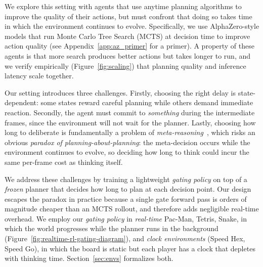 \documentclass{article}
\begin{document}
We explore this setting with agents that use anytime planning algorithms to improve the quality of their actions, but must confront that doing so takes time in which the environment continues to evolve. Specifically, we use AlphaZero-style models \citep{silver2018general} that run Monte Carlo Tree Search (MCTS) at decision time to improve action quality (see Appendix~\ref{app:az_primer} for a primer). A property of these agents is that more search produces better actions but takes longer to run, and we verify empirically (Figure~\ref{fig:scaling}) that planning quality and inference latency scale together.

Our setting introduces three challenges.
Firstly, choosing the right delay is state-dependent: some states reward careful planning
while others demand immediate reaction.
Secondly, the agent must commit to \emph{something} during the intermediate
frames, since the environment will not wait for the planner.
Lastly, choosing how long to deliberate is fundamentally a problem of
\emph{meta-reasoning}~\citep{russell1991right,horvitz2013reasoning},
which risks an obvious \emph{paradox of planning-about-planning}: the
meta-decision occurs while the environment continues to evolve, so
deciding how long to think could incur the same per-frame cost as thinking
itself.

We address these challenges by training a lightweight \emph{gating policy} on top of a \emph{frozen}
planner that decides how long to plan at
each decision point. Our design escapes the paradox in practice because a single gate
forward pass is orders of magnitude cheaper than an MCTS rollout, and
therefore adds negligible real-time overhead. We employ our \emph{gating policy} in \emph{real-time} Pac-Man, Tetris, Snake, in which the world
progresses while the planner runs in the background (Figure~\ref{fig:realtime-rl-gating-diagram}), and \emph{clock
environments} (Speed Hex, Speed Go), in which the board is static but
each player has a clock that depletes with thinking time.
Section~\ref{sec:envs} formalizes both.



\end{document}
